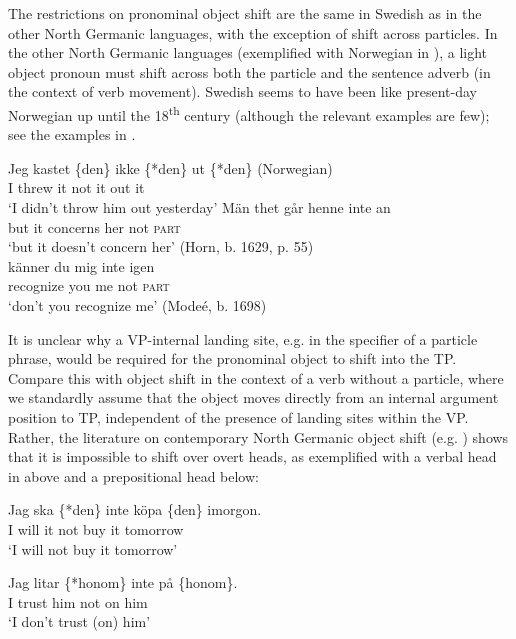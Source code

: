 \documentclass[output=paper]{langscibook}
\begin{document}
The restrictions on pronominal object shift are the same in Swedish as in the other North Germanic languages, with the exception of shift across particles. In the other North Germanic languages (exemplified with Norwegian in ), a light object pronoun must shift across both the particle and the sentence adverb (in the context of verb movement). Swedish seems to have been like present-day Norwegian up until the 18\textsuperscript{th} century (although the relevant examples are few); see the examples in .


\ea\label{ex:lalu:48}
\gll Jeg  kastet \{den\}     ikke   \{*den\}   ut   \{*den\}      (Norwegian)\\
I       threw   it      not       it      out         it\\
\glt `I didn’t throw him out yesterday'
\ex\label{ex:lalu:49}
\ea
\gll  Män   thet   går           henne   inte     an\\
    but       it    concerns   her   not     \textsc{part}\\
  \glt `but it doesn’t concern her’ (Horn, b. 1629, p. 55)\\

\ex
\gll  känner     du   mig     inte     igen \\
    recognize   you   me     not     \textsc{part}\\
\glt `don’t you recognize me’ (Modeé, b. 1698)\\
\z
\z


It is unclear why a VP-internal landing site, e.g. in the specifier of a particle phrase, would be required for the pronominal object to shift into the TP. Compare this with object shift in the context of a verb without a particle, where we standardly assume that the object moves directly from an internal argument position to TP, independent of the presence of landing sites within the VP. Rather, the literature on contemporary North Germanic object shift (e.g. \citealt{Thrainsson2001}) shows that it is impossible to shift over overt heads, as exemplified with a verbal head in  above and a prepositional head below:


\ea\label{ex:lalu:50}
\ea
\gll Jag  ska  \{*den\}   inte   köpa   \{den\}   imorgon.\\
      I         will      it      not  buy     it     tomorrow \\
\glt  ‘I will not buy it tomorrow'

\ex
\gll Jag  litar   \{*honom\}   inte   på   \{honom\}.\\
    I     trust     him     not   on     him\\
\glt  ‘I don’t trust (on) him'
\z
\z
\end{document}
